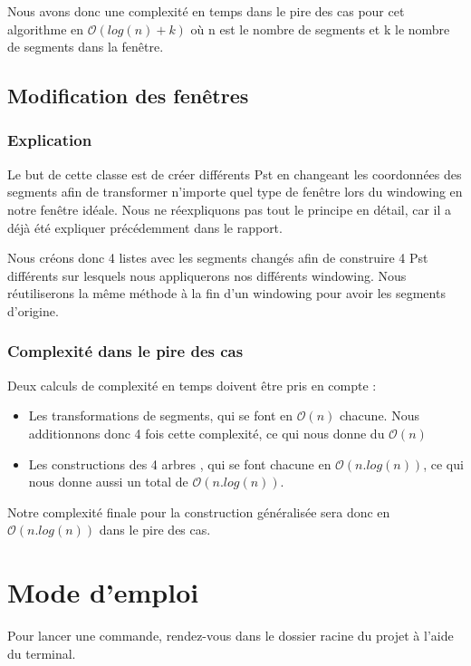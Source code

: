 \documentclass[10pt,a4paper]{article}
\begin{document}
Nous avons donc une complexité en temps dans le pire des cas pour cet algorithme en $\mathcal{O}(log(n)+k)$ où n est le nombre de segments et k le nombre de segments dans la fenêtre.

\subsection{Modification des fenêtres}


\subsubsection{Explication}
Le but de cette classe est de créer différents Pst en changeant les coordonnées des segments afin de transformer n'importe quel type de fenêtre lors du windowing en notre fenêtre idéale. Nous ne réexpliquons pas tout le principe en détail, car il a déjà été expliquer précédemment dans le rapport.

Nous créons donc 4 listes avec les segments changés afin de construire 4 Pst différents sur lesquels nous appliquerons nos différents windowing. Nous réutiliserons la même méthode à la fin d'un windowing pour avoir les segments d'origine.

\subsubsection{Complexité dans le pire des cas}
Deux calculs de complexité en temps doivent être pris en compte :
\begin{itemize}
\item Les transformations de segments, qui se font en $\mathcal{O}(n)$ chacune. Nous additionnons donc 4 fois cette complexité, ce qui nous donne du $\mathcal{O}(n)$

\item Les constructions des 4 arbres , qui se font chacune en $\mathcal{O}(n.log(n))$, ce qui nous donne aussi un total de $\mathcal{O}(n.log(n))$.

\end{itemize}

Notre complexité finale pour la construction généralisée sera donc en $\mathcal{O}(n.log(n))$ dans le pire des cas.

\newpage
\section{Mode d'emploi}
Pour lancer une commande, rendez-vous dans le dossier racine du projet à l'aide du terminal.
\end{document}
